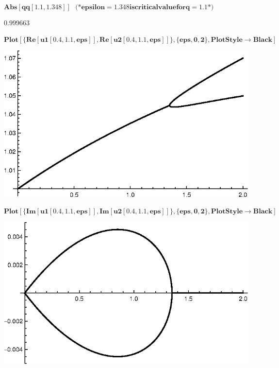 {\begin{doublespace}
\noindent\(\pmb{\text{}}\)
\end{doublespace}

\begin{doublespace}
\noindent\(\pmb{\text{Abs}[\text{qq}[1.1,1.348]]\text{    }\text{(*} \text{epsilon}=1.348 \text{is} \text{critical} \text{value} \text{for} q=1.1
\text{*)}}\)
\end{doublespace}

\begin{doublespace}
\noindent\(0.999663\)
\end{doublespace}

\begin{doublespace}
\noindent\(\pmb{\text{Plot}[\{\text{Re}[\text{u1}[0.4,1.1,\text{eps}]],\text{Re}[\text{u2}[0.4,1.1,\text{eps}]]\},\{\text{eps},0,2\},\text{PlotStyle}\to
\text{Black}]}\)
\end{doublespace}

\includegraphics{chapters/appendices/KP_Mathematica/Kronig_Penney_model_transfer_matrix_gr20.eps}

\begin{doublespace}
\noindent\(\pmb{\text{Plot}[\{\text{Im}[\text{u1}[0.4,1.1,\text{eps}]],\text{Im}[\text{u2}[0.4,1.1,\text{eps}]]\},\{\text{eps},0,2\},\text{PlotStyle}\to
\text{Black}]}\)
\end{doublespace}

\includegraphics{chapters/appendices/KP_Mathematica/Kronig_Penney_model_transfer_matrix_gr21.eps}

}
